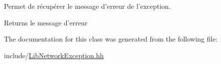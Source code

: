 Permet de récupérer le message d'erreur de l'exception. 

\begin{DoxyReturn}{Returns}
le message d'erreur 
\end{DoxyReturn}


The documentation for this class was generated from the following file\-:\begin{DoxyCompactItemize}
\item 
include/\hyperlink{_lib_network_exception_8hh}{Lib\-Network\-Exception.\-hh}\end{DoxyCompactItemize}
